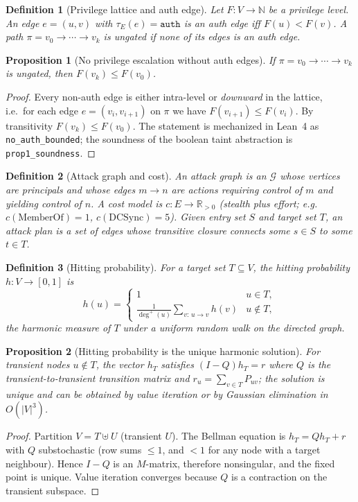 \documentclass[journal]{IEEEtran}
\newcommand{\R}{\mathbb{R}}
\newcommand{\N}{\mathbb{N}}
\newcommand{\IR}{\mathcal{G}}
\newtheorem{definition}{Definition}
\newtheorem{proposition}{Proposition}
\begin{document}
\begin{definition}[Privilege lattice and auth edge]
\label{def:auth}
Let $F:V\to\N$ be a privilege level. An edge $e=(u,v)$ with $\tau_E(e)=\texttt{auth}$
is an \emph{auth edge} iff $F(u)<F(v)$. A path $\pi=v_0\to\cdots\to v_k$ is
\emph{ungated} if none of its edges is an auth edge.
\end{definition}

\begin{proposition}[No privilege escalation without auth edges]
\label{prop:auth}
If $\pi=v_0\to\cdots\to v_k$ is ungated, then $F(v_k)\le F(v_0)$.
\end{proposition}
\begin{proof}
Every non-auth edge is either intra-level or \emph{downward} in the lattice, i.e.\
for each edge $e=(v_i,v_{i+1})$ on $\pi$ we have $F(v_{i+1})\le F(v_i)$. By
transitivity $F(v_k)\le F(v_0)$. The statement is mechanized in Lean~4 as
\texttt{no\_auth\_bounded}; the soundness of the boolean taint abstraction is
\texttt{prop1\_soundness}. \qedhere
\end{proof}

\begin{definition}[Attack graph and cost]
\label{def:cost}
An \emph{attack graph} is an $\IR$ whose vertices are principals and whose edges
$m\to n$ are \emph{actions} requiring control of $m$ and yielding control of $n$.
A \emph{cost model} is $c:E\to\R_{>0}$ (stealth plus effort; e.g.\
$c(\mathrm{MemberOf})=1$, $c(\mathrm{DCSync})=5$). Given entry set $S$ and target
set $T$, an \emph{attack plan} is a set of edges whose transitive closure connects
some $s\in S$ to some $t\in T$.
\end{definition}

\begin{definition}[Hitting probability]
\label{def:hit}
For a target set $T\subseteq V$, the \emph{hitting probability} $h:V\to[0,1]$ is
\[
h(u)=
\begin{cases}
1 & u\in T,\\
\frac{1}{\deg^{+}(u)}\sum_{v:\,u\to v}h(v) & u\notin T,
\end{cases}
\]
the harmonic measure of $T$ under a uniform random walk on the directed graph.
\end{definition}

\begin{proposition}[Hitting probability is the unique harmonic solution]
\label{prop:hit}
For transient nodes $u\notin T$, the vector $h_T$ satisfies $(I-Q)h_T=r$ where
$Q$ is the transient-to-transient transition matrix and
$r_u=\sum_{v\in T}P_{uv}$; the solution is unique and can be obtained by value
iteration or by Gaussian elimination in $O(|V|^3)$.
\end{proposition}
\begin{proof}
Partition $V=T\uplus U$ (transient $U$). The Bellman equation is
$h_T=Qh_T+r$ with $Q$ substochastic (row sums $\le1$, and $<1$ for any node with
a target neighbour). Hence $I-Q$ is an $M$-matrix, therefore nonsingular, and the
fixed point is unique. Value iteration converges because $Q$ is a contraction on
the transient subspace. \qedhere
\end{proof}
\end{document}
